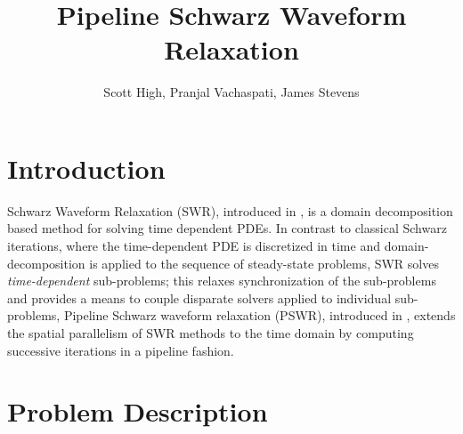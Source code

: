 \documentclass{svmult-ddm}
\begin{document}
\title*{Pipeline Schwarz Waveform Relaxation}

\author{Scott High, Pranjal Vachaspati, James Stevens}

\maketitle


\section{Introduction}
\label{prop_sec:introduction}

Schwarz Waveform Relaxation (SWR), introduced in \cite{bjorhus1995},
is a domain decomposition based method for solving time dependent
PDEs.
In contrast to classical Schwarz iterations, where
the time-dependent PDE is discretized in time and domain-decomposition
is applied to the sequence of steady-state problems, SWR solves {\em
  time-dependent} sub-problems; this relaxes synchronization of the
sub-problems and provides a means to couple disparate solvers applied
to individual sub-problems,
Pipeline Schwarz waveform relaxation (PSWR), introduced in \cite{ongpipeline},
extends the spatial parallelism of SWR methods to the time domain by
computing successive iterations in a pipeline fashion.

\section{Problem Description}
\label{prop_sec:waveform}
\end{document}
